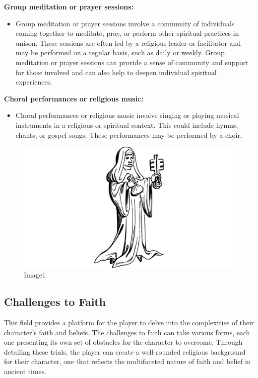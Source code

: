 \textbf{Group meditation or prayer sessions:}

\begin{itemize}
\tightlist
\item
  Group meditation or prayer sessions involve a community of individuals
  coming together to meditate, pray, or perform other spiritual
  practices in unison. These sessions are often led by a religious
  leader or facilitator and may be performed on a regular basis, such as
  daily or weekly. Group meditation or prayer sessions can provide a
  sense of community and support for those involved and can also help to
  deepen individual spiritual experiences.
\end{itemize}

\textbf{Choral performances or religious music:}

\begin{itemize}
\tightlist
\item
  Choral performances or religious music involve singing or playing
  musical instruments in a religious or spiritual context. This could
  include hymns, chants, or gospel songs. These performances may be
  performed by a choir.
\end{itemize}

\begin{figure}
\centering
\includegraphics{./images/religion05.pdf}
\caption{Image1}
\end{figure}

\hypertarget{challenges-to-faith}{%
\subsection{Challenges to Faith}\label{challenges-to-faith}}

This field provides a platform for the player to delve into the
complexities of their character's faith and beliefs. The challenges to
faith can take various forms, each one presenting its own set of
obstacles for the character to overcome. Through detailing these trials,
the player can create a well-rounded religious background for their
character, one that reflects the multifaceted nature of faith and belief
in ancient times.

